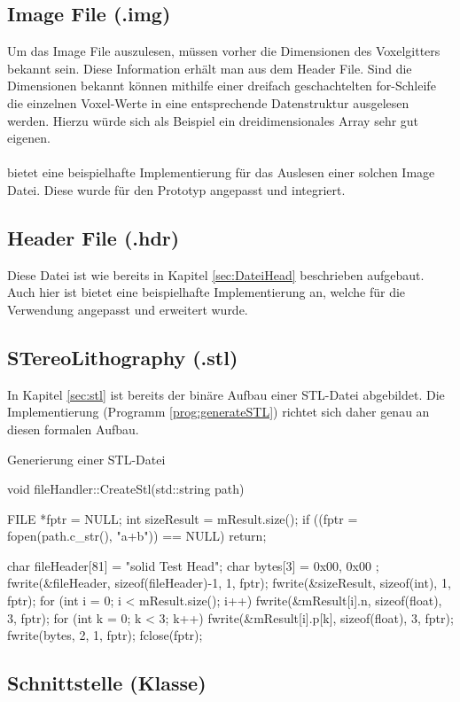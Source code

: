 \subsection{Image File (.img)}
Um das Image File auszulesen, müssen vorher die Dimensionen des Voxelgitters bekannt sein.  Diese Information erhält man aus dem Header File. Sind die Dimensionen bekannt können mithilfe einer dreifach geschachtelten for-Schleife die einzelnen Voxel-Werte in eine entsprechende Datenstruktur ausgelesen werden. Hierzu würde sich als Beispiel ein dreidimensionales Array sehr gut eigenen.\\
\\
\citep{AnalyzeFormat} bietet eine beispielhafte Implementierung für das Auslesen einer solchen Image Datei. Diese wurde für den Prototyp angepasst und integriert.
\subsection{Header File (.hdr)}
Diese Datei ist wie bereits in Kapitel \ref{sec:DateiHead} beschrieben aufgebaut. Auch hier ist bietet \citep{AnalyzeFormat} eine beispielhafte Implementierung an, welche für die Verwendung angepasst und erweitert wurde.
\subsection{STereoLithography (.stl)}
In Kapitel \ref{sec:stl} ist bereits der binäre Aufbau einer STL-Datei abgebildet. Die Implementierung (Programm \ref{prog:generateSTL}) richtet sich daher genau an diesen formalen Aufbau.
\begin{program}[H]
	\caption{Generierung einer STL-Datei}
	\label{prog:generateSTL}
	\begin{CCode}
		void fileHandler::CreateStl(std::string path){
			FILE *fptr = NULL;	
			int sizeResult = mResult.size();
			if ((fptr = fopen(path.c_str(), "a+b")) == NULL) return;
			
			char fileHeader[81] = "solid Test Head";
			char bytes[3] = { 0x00, 0x00 };
			fwrite(&fileHeader, sizeof(fileHeader)-1, 1, fptr);
			fwrite(&sizeResult, sizeof(int), 1, fptr);
			for (int i = 0; i < mResult.size(); i++) {
				fwrite(&mResult[i].n, sizeof(float), 3, fptr);
				for (int k = 0; k < 3; k++) 
					fwrite(&mResult[i].p[k], sizeof(float), 3, fptr);
				fwrite(bytes, 2, 1, fptr);
			}
			fclose(fptr);
		}
	\end{CCode}
\end{program}
\subsection{Schnittstelle (Klasse)}

